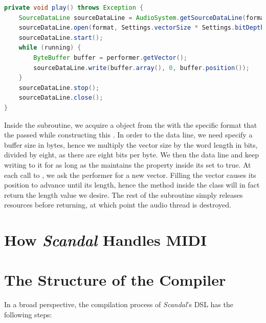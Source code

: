 \begin{lstlisting}[language=Java,caption={Writing buffers of audio data inside the \il{play} subroutine.},label={alg:play}]
private void play() throws Exception {
	SourceDataLine sourceDataLine = AudioSystem.getSourceDataLine(format);
	sourceDataLine.open(format, Settings.vectorSize * Settings.bitDepth / 8);
	sourceDataLine.start();
	while (running) {
		ByteBuffer buffer = performer.getVector();
		sourceDataLine.write(buffer.array(), 0, buffer.position());
	}
	sourceDataLine.stop();
	sourceDataLine.close();
}
\end{lstlisting}

Inside the  subroutine, we acquire a  object from the  with the specific format that the  passed while constructing this . In order to  the data line, we need specify a buffer size in bytes, hence we multiply the vector size by the word length in bits, divided by eight, as there are eight bits per byte. We then  the data line and keep writing to it for as long as the  maintains the  property inside its  set to true. At each call to , we ask the performer for a new vector. Filling the vector causes its position to advance until its length, hence the  method inside the  class will in fact return the length value we desire. The rest of the  subroutine simply releases resources before returning, at which point the audio thread is destroyed.

\section{How \emph{Scandal} Handles MIDI}

\section{The Structure of the Compiler}

In a broad perspective, the compilation process of \emph{Scandal}'s DSL has the following steps:


